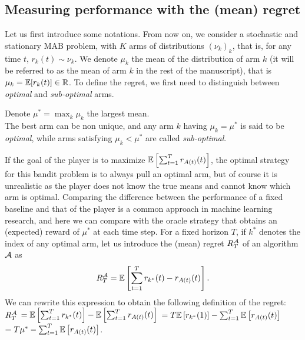 \subsection{Measuring performance with the (mean) regret}

Let us first introduce some notations.
From now on, we consider a stochastic and stationary MAB problem, with $K$ arms of distributions $(\nu_k)_k$, that is, for any time $t$, $r_k(t)\sim \nu_k$.
We denote $\mu_k$ the mean of the distribution of arm $k$ (it will be referred to as the mean of arm $k$ in the rest of the manuscript), that is $\mu_k = \mathbb{E}[r_k(t)] \in \mathbb{R}$.
%
%
To define the regret, we first need to distinguish between \emph{optimal} and \emph{sub-optimal} arms.

\begin{defn}\label{def:2:optimalSubOptimalArms}
    Denote $\mu^* = \max_k \mu_k$ the largest mean.\\
    The best arm can be non unique, and any arm $k$ having $\mu_k = \mu^*$ is said to be \emph{optimal},
    while arms satisfying $\mu_k < \mu^*$ are called \emph{sub-optimal}.
\end{defn}

If the goal of the player is to maximize $\mathbb{E}\left[\sum_{t=1}^T r_{A(t)}(t)\right]$,
the optimal strategy for this bandit problem is to always pull an optimal arm, but of course it is unrealistic as the player does not know the true means and cannot know which arm is optimal.
%
Comparing the difference between the performance of a fixed baseline and that of the player is a common approach in machine learning research,
and here we can compare with the oracle strategy that obtains an (expected) reward of $\mu^*$ at each time step.
%
For a fixed horizon $T$, if $k^*$ denotes the index of any optimal arm,
let us introduce the (mean) regret $R_T^{\mathcal{A}}$ of an algorithm $\mathcal{A}$ as
\[ R_T^{\mathcal{A}} = \mathbb{E}\left[ \sum_{t=1}^T r_{k^*}(t) - r_{A(t)}(t) \right]. \]
%
We can rewrite this expression to obtain the following definition of the regret:
$R_T^{\mathcal{A}}$
$= \mathbb{E}\left[ \sum_{t=1}^T r_{k^*}(t) \right] - \mathbb{E}\left[ \sum_{t=1}^T r_{A(t)}(t) \right]$
$= T \mathbb{E}\left[ r_{k^*}(1) \right] - \sum_{t=1}^T \mathbb{E}\left[ r_{A(t)}(t) \right]$
$= T \mu^* - \sum_{t=1}^T \mathbb{E}\left[ r_{A(t)}(t) \right]$.


